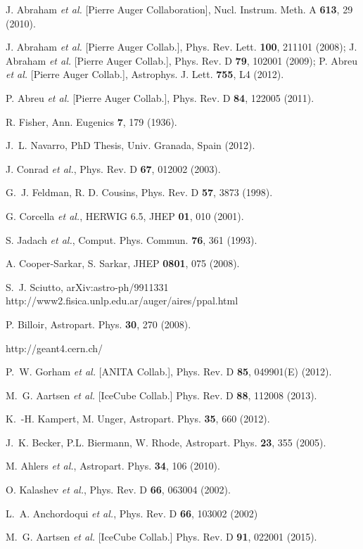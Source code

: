 \documentclass[reprint,showpacs,showkeys,amsmath,amssymb,aps,nofootinbib]{revtex4-1}
\begin{document}
\begin{thebibliography}{99}
J. Abraham {\it et al.} [Pierre Auger Collaboration],  
Nucl. Instrum. Meth. A {\bf 613}, 29 (2010).

J. Abraham {\it et al.} 
[Pierre Auger Collab.],
Phys. Rev. Lett. {\bf 100}, 211101 (2008);
J. Abraham {\it et al.} 
[Pierre Auger Collab.],
Phys. Rev. D {\bf 79}, 102001 (2009);
P. Abreu {\it et al.} 
[Pierre Auger Collab.],
Astrophys. J. Lett. {\bf 755}, L4 (2012).

P. Abreu {\it et al.} 
[Pierre Auger Collab.], Phys. Rev. D {\bf 84}, 122005 (2011).

R. Fisher,
Ann. Eugenics {\bf 7}, 179 (1936).

J.~L. Navarro, 
PhD Thesis, Univ. Granada, Spain (2012).

J. Conrad {\it et al.}, Phys. Rev. D {\bf 67}, 012002 (2003).

G.~J. Feldman, R. D. Cousins, Phys. Rev. D {\bf 57}, 3873 (1998).

G. Corcella {\it et al.},
{\sc HERWIG} 6.5,
JHEP {\bf 01}, 010 (2001).

S. Jadach {\it et al.},
Comput. Phys. Commun. {\bf 76}, 361 (1993).

A. Cooper-Sarkar, S. Sarkar, JHEP {\bf 0801}, 075 (2008).

S.~J. Sciutto, arXiv:astro-ph/9911331
{http://www2.fisica.unlp.edu.ar/auger/aires/ppal.html}

P. Billoir, Astropart. Phys. {\bf 30}, 270 (2008).

http://geant4.cern.ch/

P.~W. Gorham {\it et al.} [ANITA Collab.],
Phys. Rev. D {\bf 85}, 049901(E) (2012).

M.~G. Aartsen {\it et al.} [IceCube Collab.]
Phys. Rev. D {\bf 88}, 112008 (2013). 

K.~-H. Kampert, M. Unger, 
Astropart. Phys. {\bf 35}, 660 (2012). 

J.~K. Becker, P.L. Biermann, W. Rhode,
Astropart. Phys. {\bf 23}, 355 (2005).

M. Ahlers {\it et al.}, Astropart. Phys. {\bf 34}, 106 (2010).

O. Kalashev {\it et al.},
Phys. Rev. D {\bf 66}, 063004 (2002). 

L.~A. Anchordoqui {\it et al.}, 
Phys. Rev. D {\bf 66}, 103002 (2002)

M.~G. Aartsen {\it et al.} [IceCube Collab.]
Phys. Rev. D {\bf 91}, 022001 (2015). 

\end{thebibliography}
\end{document}
